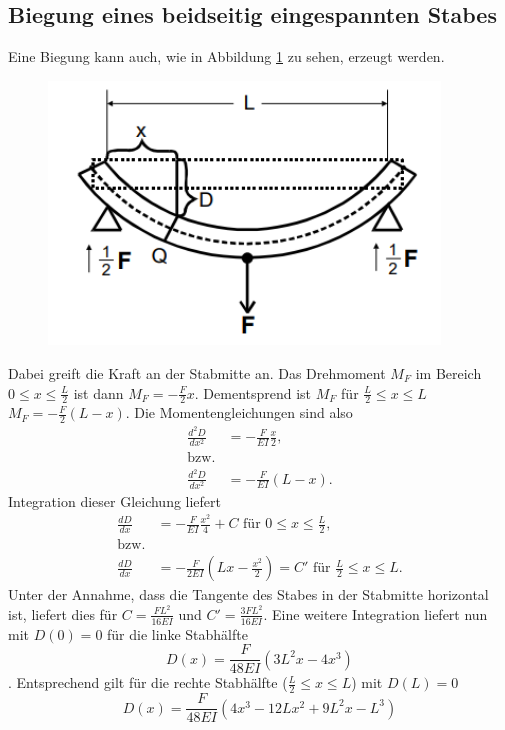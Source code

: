 \subsection{Biegung eines beidseitig eingespannten Stabes}
Eine Biegung kann auch, wie in Abbildung \ref{Fig:Beidseitig} zu sehen, erzeugt werden.
\begin{figure}[H]
    \centering
    \captionsetup{justification=centering}
    \includegraphics[height=7cm]{"Beidseitig_Biegung.png"}
    \label{Fig:Beidseitig}
\end{figure}
Dabei greift die Kraft an der Stabmitte an. Das Drehmoment $M_F$ im Bereich $0\leq x \leq\frac{L}{2}$ ist dann $M_F=-\frac{F}{2}x$. Dementsprend ist $M_F$ für $\frac{L}{2}\leq x\leq L$ $M_F=-\frac{F}{2}(L-x)$.
Die Momentengleichungen sind also 
\begin{align*}
    \frac{d^2D}{dx^2}&=-\frac{F}{EI}\frac{x}{2},\\
    \text{bzw.}\\
    \frac{d^2D}{dx^2}&=-\frac{F}{EI}(L-x).  
\end{align*}
Integration dieser Gleichung liefert 
\begin{align*}
    \frac{dD}{dx}&=-\frac{F}{EI}\frac{x^2}{4}+C\text{  für  }0\leq x \leq\frac{L}{2},\\
    \text{bzw.}\\
    \frac{dD}{dx}&=-\frac{F}{2EI}(Lx-\frac{x^2}{2})=C'\text{  für  }\frac{L}{2}\leq x\leq L.
\end{align*}
Unter der Annahme, dass die Tangente des Stabes in der Stabmitte horizontal ist, liefert dies für $C=\frac{FL^2}{16EI}$ und $C'=\frac{3FL^2}{16EI}$. Eine weitere Integration liefert nun mit $D(0)=0$ für die linke Stabhälfte
\begin{equation*}
    D(x)=\frac{F}{48EI}(3L^2x-4x^3)
\end{equation*}.
Entsprechend gilt für die rechte Stabhälfte ($\frac{L}{2}\leq x\leq L$) mit $D(L)=0$ 
\begin{equation*}
    D(x)=\frac{F}{48EI}(4x^3-12Lx^2+9L^2x-L^3)
\end{equation*}
